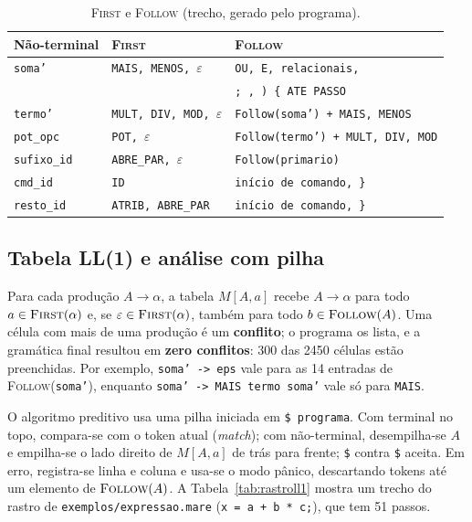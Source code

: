 \documentclass[conference]{IEEEtran}
\begin{document}
\begin{table}[t]
\centering
\caption{\textsc{First} e \textsc{Follow} (trecho, gerado pelo programa).}\label{tab:ff}
\scriptsize
\begin{tabular}{@{}lll@{}}
\toprule
Não-terminal & \textsc{First} & \textsc{Follow} \\
\midrule
\texttt{soma'}      & \texttt{MAIS, MENOS, $\varepsilon$} & \texttt{OU, E, relacionais,} \\
                    &                                     & \texttt{; , ) \{ ATE PASSO} \\
\texttt{termo'}     & \texttt{MULT, DIV, MOD, $\varepsilon$} & \texttt{Follow(soma') + MAIS, MENOS} \\
\texttt{pot\_opc}   & \texttt{POT, $\varepsilon$} & \texttt{Follow(termo') + MULT, DIV, MOD} \\
\texttt{sufixo\_id} & \texttt{ABRE\_PAR, $\varepsilon$} & \texttt{Follow(primario)} \\
\texttt{cmd\_id}    & \texttt{ID} & \texttt{início de comando, \}} \\
\texttt{resto\_id}  & \texttt{ATRIB, ABRE\_PAR} & \texttt{início de comando, \}} \\
\bottomrule
\end{tabular}
\end{table}

\subsection{Tabela LL(1) e análise com pilha}\label{sec:tabelall1}
Para cada produção $A\to\alpha$, a tabela $M[A,a]$ recebe $A\to\alpha$ para
todo $a\in\textsc{First}(\alpha)$ e, se $\varepsilon\in\textsc{First}(\alpha)$,
também para todo $b\in\textsc{Follow}(A)$. Uma célula com mais de uma
produção é um \textbf{conflito}; o programa os lista, e a gramática final
resultou em \textbf{zero conflitos}: 300 das 2450 células estão
preenchidas. Por exemplo, \texttt{soma' -> eps} vale para as 14 entradas de
\textsc{Follow}(\texttt{soma'}), enquanto \texttt{soma' -> MAIS termo soma'}
vale só para \texttt{MAIS}.

O algoritmo preditivo usa uma pilha iniciada em \texttt{\$ programa}.
Com terminal no topo, compara-se com o token atual (\emph{match}); com
não-terminal, desempilha-se $A$ e empilha-se o lado direito de $M[A,a]$ de
trás para frente; \texttt{\$} contra \texttt{\$} aceita. Em erro, registra-se
linha e coluna e usa-se o modo pânico, descartando tokens até um elemento de
$\textsc{Follow}(A)$. A Tabela~\ref{tab:rastroll1} mostra um trecho do rastro de
\texttt{exemplos/expressao.mare} (\texttt{x = a + b * c;}), que tem 51 passos.
\end{document}
